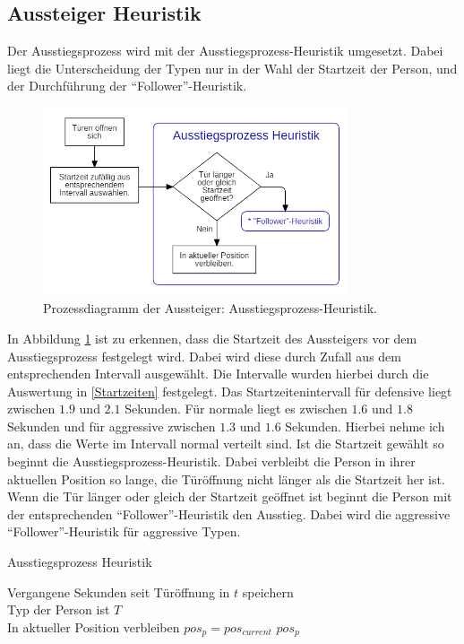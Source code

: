 \subsection{Aussteiger Heuristik} \label{AM}
Der Ausstiegsprozess wird mit der Ausstiegsprozess-Heuristik umgesetzt. Dabei liegt die Unterscheidung der Typen nur in der Wahl der Startzeit der Person, und der Durchführung der "`Follower"'-Heuristik.
\begin{figure}[H]
	\centering
		\includegraphics[width=0.8\textwidth]{pictures/model/algorithm/alight/alight_process.png}
	\caption{Prozessdiagramm der Aussteiger: Ausstiegsprozess-Heuristik.}
	\label{fig:AH}
\end{figure}
In Abbildung \ref{fig:AH} ist zu erkennen, dass die Startzeit des Aussteigers vor dem Ausstiegsprozess festgelegt wird. Dabei wird diese durch Zufall aus dem entsprechenden Intervall ausgewählt. Die Intervalle wurden hierbei durch die Auswertung in \ref{Startzeiten} festgelegt. Das Startzeitenintervall für defensive liegt zwischen $1.9$ und $2.1$ Sekunden. Für normale liegt es zwischen $1.6$ und $1.8$ Sekunden und für aggressive zwischen $1.3$ und $1.6$ Sekunden. Hierbei nehme ich an, dass die Werte im Intervall normal verteilt sind. Ist die Startzeit gewählt so beginnt die Ausstiegsprozess-Heuristik. Dabei verbleibt die Person in ihrer aktuellen Position so lange, die Türöffnung nicht länger als die Startzeit her ist. Wenn die Tür länger oder gleich der Startzeit geöffnet ist beginnt die Person mit der entsprechenden "`Follower"'-Heuristik den Ausstieg. Dabei wird die aggressive "`Follower"'-Heuristik für aggressive Typen. 

\begin{algorithm} [H]
	\caption{Ausstiegsprozess Heuristik}

	\AlightHeuristic{} {
		Vergangene Sekunden seit Türöffnung in $t$ speichern\\
		Typ der Person ist $T$ \\
		 {
			In aktueller Position verbleiben $pos_{p} = pos_{current}$ 
		} 
		\Return $pos_p$
	}
\end{algorithm}

